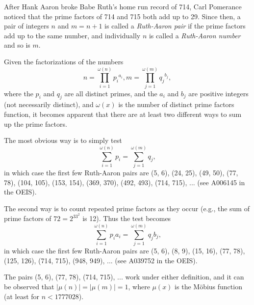 \documentclass[12pt]{article}
\begin{document}
After Hank Aaron broke Babe Ruth's home run record of 714, Carl Pomerance noticed that the prime factors of 714 and 715 both add up to 29. Since then, a pair of integers $n$ and $m = n + 1$ is called a {\em Ruth-Aaron pair} if the prime factors add up to the same number, and individually $n$ is called a {\em Ruth-Aaron number} and so is $m$.

Given the factorizations of the numbers $$n = \prod_{i = 1}^{\omega(n)} {p_i}^{a_i}, m = \prod_{j = 1}^{\omega(m)} {q_j}^{b_j},$$ where the $p_i$ and $q_j$ are all distinct primes, and the $a_i$ and $b_j$ are positive integers (not necessarily distinct), and $\omega(x)$ is the number of distinct prime factors function, it becomes apparent that there are at least two different ways to sum up the prime factors.

The most obvious way is to simply test $$\sum_{i = 1}^{\omega(n)} p_i = \sum_{j = 1}^{\omega(m)} q_j,$$ in which case the first few Ruth-Aaron pairs are (5, 6), (24, 25), (49, 50), (77, 78), (104, 105), (153, 154), (369, 370), (492, 493), (714, 715), ... (see A006145 in the OEIS).

The second way is to count repeated prime factors as they occur (e.g., the sum of prime factors of $72 = 2^33^2$ is 12). Thus the test becomes $$\sum_{i = 1}^{\omega(n)} p_ia_i = \sum_{j = 1}^{\omega(m)} q_jb_j,$$ in which case the first few Ruth-Aaron pairs are (5, 6), (8, 9), (15, 16), (77, 78), (125, 126), (714, 715), (948, 949), ... (see A039752 in the OEIS).

The pairs (5, 6), (77, 78), (714, 715), ... work under either definition, and it can be observed that $|\mu(n)| = |\mu(m)| = 1$, where $\mu(x)$ is the M\"obius function (at least for $n < 1777028$).
\end{document}

